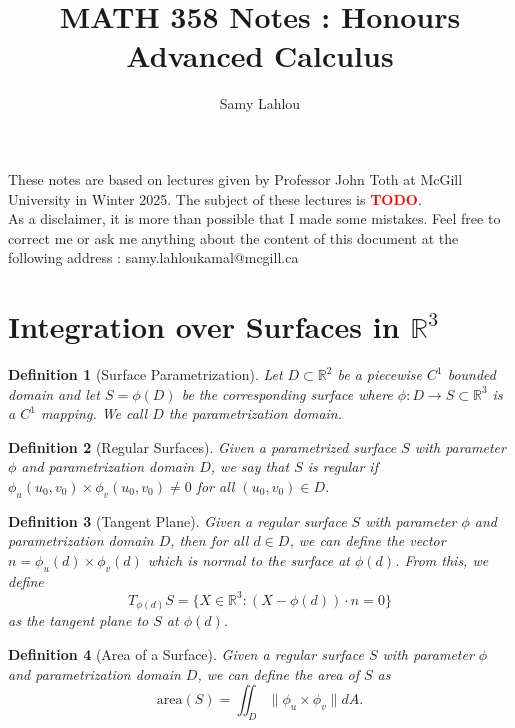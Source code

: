 \documentclass{article}
\title{MATH 358 Notes : Honours Advanced Calculus}
\author{Samy Lahlou}
\date{}
\newtheorem*{definition}{Definition}
\newcommand{\R}{\mathbb{R}}
\newcommand{\td}{\textcolor{red}{\textbf{TODO}}}
\begin{document}
\maketitle

These notes are based on lectures given by Professor John Toth at McGill University in Winter 2025. The subject of these lectures is \td . \\
As a disclaimer, it is more than possible that I made some mistakes. Feel free to correct me or ask me anything about the content of this document at the following address : samy.lahloukamal@mcgill.ca

\tableofcontents

\newpage

\section{Integration over Surfaces in $\R^3$}

\begin{definition}[Surface Parametrization]
    Let $D \subset \R^2$ be a piecewise $C^1$ bounded domain and let $S = \phi(D)$ be the corresponding surface where $\phi : D \to S \subset \R^3$ is a $C^1$ mapping. We call $D$ the parametrization domain.
\end{definition}

\begin{definition}[Regular Surfaces]
    Given a parametrized surface $S$ with parameter $\phi$ and parametrization domain $D$, we say that $S$ is regular if $\phi_u(u_0, v_0) \times \phi_v(u_0, v_0) \neq 0$ for all $(u_0, v_0) \in D$.
\end{definition}

\begin{definition}[Tangent Plane]
    Given a regular surface $S$ with parameter $\phi$ and parametrization domain $D$, then for all $d \in D$, we can define the vector $n = \phi_u(d) \times \phi_v(d)$ which is normal to the surface at $\phi(d)$. From this, we define 
    $$T_{\phi(d)}S = \{X \in \R^3 : (X - \phi(d))\cdot n = 0\}$$
    as the tangent plane to $S$ at $\phi(d)$.
\end{definition}

\begin{definition}[Area of a Surface]
    Given a regular surface $S$ with parameter $\phi$ and parametrization domain $D$, we can define the area of $S$ as
    $$\text{area}(S) = \iint_D \|\phi_u \times \phi_v\| dA.$$
\end{definition}
\end{document}
